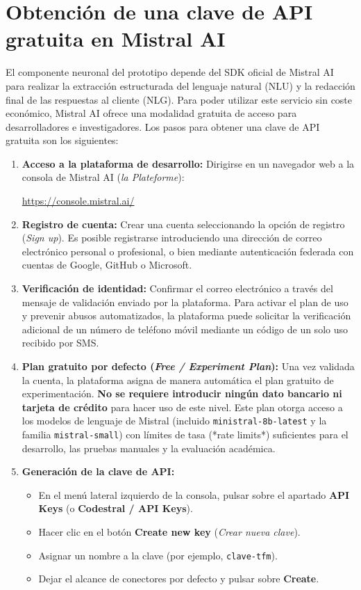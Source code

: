 \section{Obtención de una clave de API gratuita en Mistral AI}

El componente neuronal del prototipo depende del SDK oficial de Mistral AI para realizar la extracción estructurada del lenguaje natural (NLU) y la redacción final de las respuestas al cliente (NLG). Para poder utilizar este servicio sin coste económico, Mistral AI ofrece una modalidad gratuita de acceso para desarrolladores e investigadores. Los pasos para obtener una clave de API gratuita son los siguientes:

\begin{enumerate}
    \item \textbf{Acceso a la plataforma de desarrollo:} Dirigirse en un navegador web a la consola de Mistral AI (\textit{la Plateforme}):
    \begin{center}
    \url{https://console.mistral.ai/}
    \end{center}

    \item \textbf{Registro de cuenta:} Crear una cuenta seleccionando la opción de registro (\textit{Sign up}). Es posible registrarse introduciendo una dirección de correo electrónico personal o profesional, o bien mediante autenticación federada con cuentas de Google, GitHub o Microsoft.

    \item \textbf{Verificación de identidad:} Confirmar el correo electrónico a través del mensaje de validación enviado por la plataforma. Para activar el plan de uso y prevenir abusos automatizados, la plataforma puede solicitar la verificación adicional de un número de teléfono móvil mediante un código de un solo uso recibido por SMS.

    \item \textbf{Plan gratuito por defecto (\textit{Free / Experiment Plan}):} Una vez validada la cuenta, la plataforma asigna de manera automática el plan gratuito de experimentación. \textbf{No se requiere introducir ningún dato bancario ni tarjeta de crédito} para hacer uso de este nivel. Este plan otorga acceso a los modelos de lenguaje de Mistral (incluido \texttt{ministral-8b-latest} y la familia \texttt{mistral-small}) con límites de tasa (*rate limits*) suficientes para el desarrollo, las pruebas manuales y la evaluación académica.

    \item \textbf{Generación de la clave de API:}
    \begin{itemize}
        \item En el menú lateral izquierdo de la consola, pulsar sobre el apartado \textbf{API Keys} (o \textbf{Codestral / API Keys}).
        \item Hacer clic en el botón \textbf{Create new key} (\textit{Crear nueva clave}).
        \item Asignar un nombre a la clave (por ejemplo, \texttt{clave-tfm}).
        \item Dejar el alcance de conectores por defecto y pulsar sobre \textbf{Create}.
    \end{itemize}


\end{enumerate}
